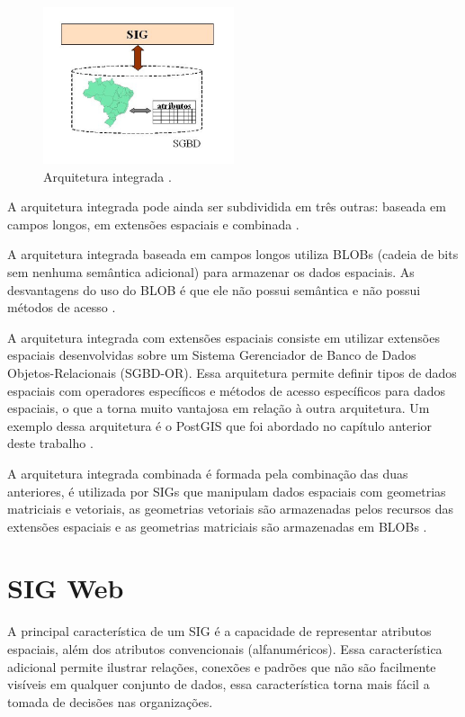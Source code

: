 \newpage

\begin{figure}[h]
\centering
\includegraphics[width=0.50\textwidth]{./img/cap_III/3-ArquiteturaIntegrada}
\caption{Arquitetura integrada \cite{queirozferreira}.}
\label{fig:ArquiteturaIntegrada}
\end{figure}

A arquitetura integrada pode ainda ser subdividida em três outras: baseada em campos longos, em extensões espaciais e combinada \cite{queirozferreira, bancogeo}.

A arquitetura integrada baseada em campos longos utiliza BLOBs (cadeia de bits sem nenhuma semântica adicional) para armazenar os dados espaciais. As desvantagens do uso do BLOB é que ele não possui semântica e não possui métodos de acesso \cite{queirozferreira}.

A arquitetura integrada com extensões espaciais consiste em utilizar extensões espaciais desenvolvidas sobre um Sistema Gerenciador de Banco de Dados Objetos-Relacionais (SGBD-OR). Essa arquitetura permite definir tipos de dados espaciais com operadores específicos e métodos de acesso específicos para dados espaciais, o que a torna muito vantajosa em relação à outra arquitetura. Um exemplo dessa arquitetura é o PostGIS que foi abordado no capítulo anterior deste trabalho \cite{queirozferreira}.

A arquitetura integrada combinada é formada pela combinação das duas anteriores, é utilizada por SIGs que manipulam dados espaciais com geometrias matriciais e vetoriais, as geometrias vetoriais são armazenadas pelos recursos das extensões espaciais e as geometrias matriciais são armazenadas em BLOBs \cite{queirozferreira}.

\section{SIG Web}

A principal característica de um SIG é a capacidade de representar atributos espaciais, além dos atributos convencionais (alfanuméricos). Essa característica adicional permite ilustrar relações, conexões e padrões que não são facilmente visíveis em qualquer conjunto de dados, essa característica torna mais fácil a tomada de decisões nas organizações.

